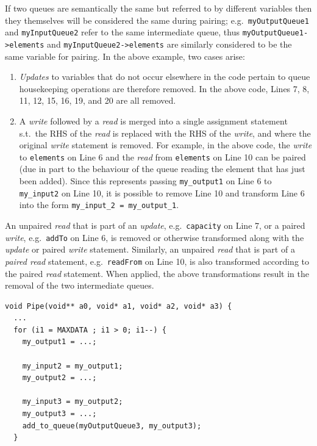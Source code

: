 %
If two queues are semantically the same but referred to by different variables then they themselves will be considered the same during pairing; e.g.\ \lstinline|myOutputQueue1| and \lstinline|myInputQueue2| refer to the same intermediate queue, thus \lstinline|myOutputQueue1->elements| and \lstinline|myInputQueue2->elements| are similarly considered to be the same variable for pairing.
%
In the above example, two cases arise:
%
\begin{enumerate}
\item \emph{Updates} to variables that do not occur elsewhere in the code pertain to queue housekeeping operations are therefore removed.
%
In the above code, Lines 7, 8, 11, 12, 15, 16, 19, and 20 are all removed.


\item A \emph{write} followed by a \emph{read} is merged into a single assignment statement s.t.\ the RHS of the \emph{read} is replaced with the RHS of the \emph{write}, and where the original \emph{write} statement is removed.
%
For example, in the above code, the \emph{write} to \lstinline|elements| on Line 6 and the \emph{read} from \lstinline|elements| on Line 10 can be paired (due in part to the behaviour of the queue reading the element that has just been added). Since this represents passing \lstinline|my_output1| on Line 6 to \lstinline|my_input2| on Line 10, it is possible to remove Line 10 and transform Line 6 into the form \lstinline|my_input_2 = my_output_1|.
%
\end{enumerate}
%
An unpaired \emph{read} that is part of an \emph{update}, e.g.\ \lstinline|capacity| on Line 7, or a paired \emph{write}, e.g.\ \lstinline|addTo| on Line 6, is removed or otherwise transformed along with the \emph{update} or paired \emph{write} statement. Similarly, an unpaired \emph{read} that is part of a \emph{paired read} statement, e.g.\ \lstinline|readFrom| on Line 10, is also transformed according to the paired \emph{read} statement.
%
%
When applied, the above transformations result in the removal of the two intermediate queues.
%
\begin{lstlisting}
void Pipe(void** a0, void* a1, void* a2, void* a3) {
  ...
  for (i1 = MAXDATA ; i1 > 0; i1--) {
    my_output1 = ...;

    my_input2 = my_output1;
    my_output2 = ...;

    my_input3 = my_output2;
    my_output3 = ...;
    add_to_queue(myOutputQueue3, my_output3);
  }
\end{lstlisting}

